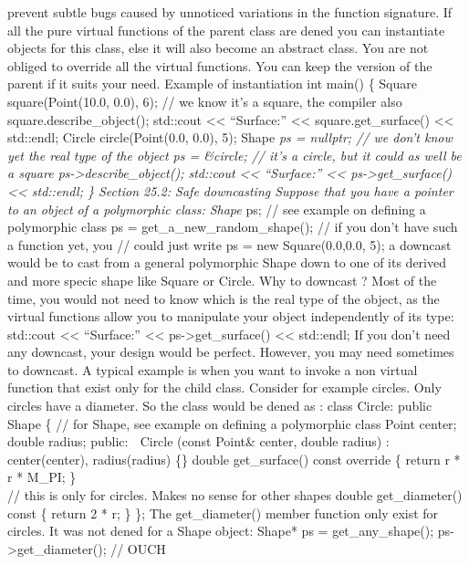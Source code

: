 prevent subtle bugs caused by unnoticed variations in the function
signature. If all the pure virtual functions of the parent class are
dened you can instantiate objects for this class, else it will also
become an abstract class. You are not obliged to override all the
virtual functions. You can keep the version of the parent if it suits
your need. Example of instantiation int main() \{ Square
square(Point(10.0, 0.0), 6); // we know it's a square, the compiler also
square.describe\_object(); std::cout \textless\textless{} ``Surface:''
\textless\textless{} square.get\_surface() \textless\textless{}
std::endl; Circle circle(Point(0.0, 0.0), 5); Shape \emph{ps = nullptr;
// we don't know yet the real type of the object ps = \&circle; // it's
a circle, but it could as well be a square
ps-\textgreater describe\_object(); std::cout \textless\textless{}
``Surface:'' \textless\textless{} ps-\textgreater get\_surface()
\textless\textless{} std::endl; \} Section 25.2: Safe downcasting
Suppose that you have a pointer to an object of a polymorphic class:
Shape }ps; // see example on defining a polymorphic class ps =
get\_a\_new\_random\_shape(); // if you don't have such a function yet,
you // could just write ps = new Square(0.0,0.0, 5); a downcast would be
to cast from a general polymorphic Shape down to one of its derived and
more specic shape like Square or Circle. Why to downcast ? Most of the
time, you would not need to know which is the real type of the object,
as the virtual functions allow you to manipulate your object
independently of its type: std::cout \textless\textless{} ``Surface:''
\textless\textless{} ps-\textgreater get\_surface() \textless\textless{}
std::endl; If you don't need any downcast, your design would be perfect.
However, you may need sometimes to downcast. A typical example is when
you want to invoke a non virtual function that exist only for the child
class. Consider for example circles. Only circles have a diameter. So
the class would be dened as : class Circle: public Shape \{ // for
Shape, see example on defining a polymorphic class Point center; double
radius; public:  Circle (const Point\& center, double radius) :
center(center), radius(radius) \{\} double get\_surface() const override
\{ return r * r * M\_PI; \}\\
// this is only for circles. Makes no sense for other shapes double
get\_diameter() const \{ return 2 * r; \} \}; The get\_diameter() member
function only exist for circles. It was not dened for a Shape object:
Shape* ps = get\_any\_shape(); ps-\textgreater get\_diameter(); // OUCH
